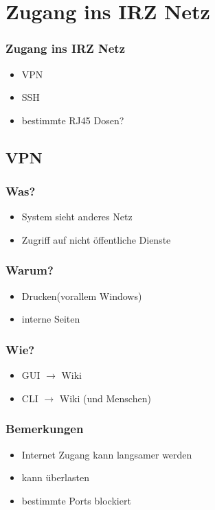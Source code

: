 \documentclass{beamer}
\begin{document}
    \section{Zugang ins IRZ Netz}
    \begin{frame}
        \frametitle{Zugang ins IRZ Netz}
        \begin{itemize}
            \item VPN
            \item SSH
            \item bestimmte RJ45 Dosen?
        \end{itemize}
    \end{frame}

    \subsection{VPN}
    \begin{frame}
        \frametitle{Was?}
        \begin{itemize}
            \item System \glqq sieht{\grqq} anderes Netz
            \item Zugriff auf nicht öffentliche Dienste
        \end{itemize}
    \end{frame}
    \begin{frame}
        \frametitle{Warum?}
        \begin{itemize}
            \item Drucken(vorallem Windows)
            \item interne Seiten
        \end{itemize}
    \end{frame}
    \begin{frame}
        \frametitle{Wie?}
        \begin{itemize}
            \item GUI $\longrightarrow$ Wiki
            \item CLI $\longrightarrow$ Wiki (und Menschen)
        \end{itemize}
    \end{frame}
    \begin{frame}
        \frametitle{Bemerkungen}
        \begin{itemize}
            \item Internet Zugang kann langsamer werden
            \item kann überlasten
            \item bestimmte Ports blockiert
        \end{itemize}
    \end{frame}
\end{document}
